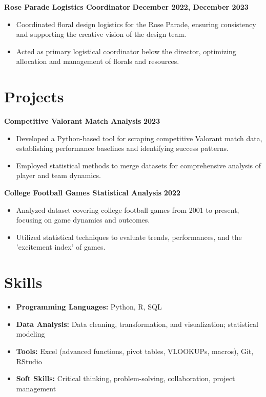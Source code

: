 \documentclass[10pt]{article}
\begin{document}
\textbf{Rose Parade Logistics Coordinator} \hfill \textbf{December 2022, December 2023}
\begin{itemize}
    \item Coordinated floral design logistics for the Rose Parade, ensuring consistency and supporting the creative vision of the design team.
    \item Acted as primary logistical coordinator below the director, optimizing allocation and management of florals and resources.
\end{itemize}

\vspace{-10pt}
\section*{Projects}
\textbf{Competitive Valorant Match Analysis} \hfill \textbf{2023}
\begin{itemize}
    \item Developed a Python-based tool for scraping competitive Valorant match data, establishing performance baselines and identifying success patterns.
    \item Employed statistical methods to merge datasets for comprehensive analysis of player and team dynamics.
\end{itemize}

\textbf{College Football Games Statistical Analysis} \hfill \textbf{2022}
\begin{itemize}
    \item Analyzed dataset covering college football games from 2001 to present, focusing on game dynamics and outcomes.
    \item Utilized statistical techniques to evaluate trends, performances, and the 'excitement index' of games.
\end{itemize}

\vspace{-10pt}
\section*{Skills}
\begin{itemize}
    \item \textbf{Programming Languages:} Python, R, SQL
    \item \textbf{Data Analysis:} Data cleaning, transformation, and visualization; statistical modeling
    \item \textbf{Tools:} Excel (advanced functions, pivot tables, VLOOKUPs, macros), Git, RStudio
    \item \textbf{Soft Skills:} Critical thinking, problem-solving, collaboration, project management
\end{itemize}
\end{document}
